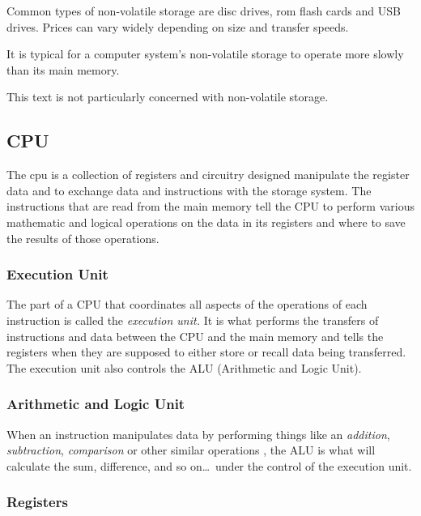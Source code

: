 Common types of non-volatile storage are disc drives, 
\acrshort{rom} flash cards and USB 
drives.  Prices can vary widely depending on size and transfer speeds.

It is typical for a computer system's non-volatile storage to operate
more slowly than its main memory.

This text is not particularly concerned with non-volatile storage. 

\subsection{CPU}

The \acrshort{cpu} is a collection of registers and circuitry designed
manipulate the register data and to exchange data and instructions with the 
storage system.  The instructions that are read from the main memory tell 
the CPU to perform various mathematic and logical operations on the data 
in its registers and where to save the results of those operations.

\subsubsection{Execution Unit}

The part of a CPU that coordinates all aspects of the operations of each 
instruction is called the {\em execution unit.}  It is what performs the transfers 
of instructions and data between the CPU and the main memory and tells the 
registers when they are supposed to either store or recall data being transferred.  
The execution unit also controls the ALU (Arithmetic and Logic Unit).

\subsubsection{Arithmetic and Logic Unit}

When an instruction manipulates data by performing things like an {\em addition},
{\em subtraction}, {\em comparison} or other similar operations , the ALU is what
will calculate the sum, difference, and so on\ldots\ under the control of the 
execution unit.



\subsubsection{Registers}

